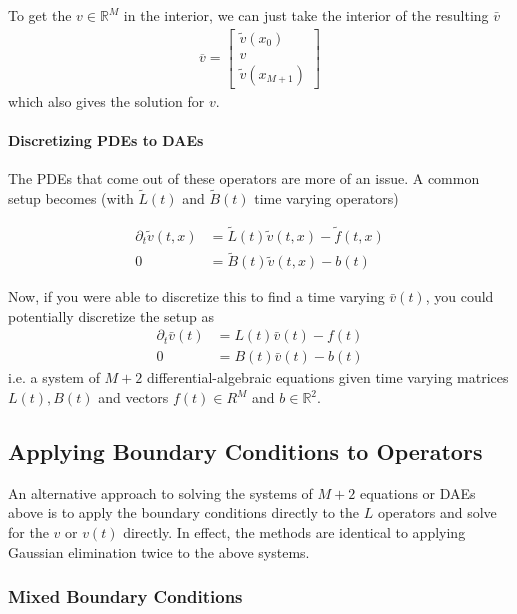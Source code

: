 \documentclass[11pt]{article}
\newcommand{\R}{\ensuremath{\mathbb{R}}}
\newcommand{\D}[1][]{\ensuremath{\partial_{#1}}}
\theoremstyle{definition}
\begin{document}
To get the $v\in \R^M$ in the interior, we can just take the interior of the resulting $\bar{v}$
\begin{align}
	\overline{v} = \begin{bmatrix}
	\tilde{v}(x_0) \\
	v \\
	\tilde{v}(x_{M+1})
	\end{bmatrix}
\end{align}
which also gives the solution for $v$.

\paragraph{Discretizing PDEs to DAEs}
The PDEs that come out of these operators are more of an issue.  A common setup becomes (with $\tilde{L}(t)$ and $\tilde{B}(t)$ time varying operators)

\begin{align}
	\D[t] \tilde{v}(t,x) &= \tilde{L}(t) \tilde{v}(t,x) - \tilde{f}(t,x)  \\
	0 &= \tilde{B}(t) \tilde{v}(t,x) - b(t)
\end{align}

Now, if you were able to discretize this to find a time varying $\bar{v}(t)$, you could potentially discretize the setup as
\begin{align}
	\D[t] \bar{v}(t) &= L(t) \bar{v}(t) - f(t)\\
	0 &= B(t) \bar{v}(t) - b(t)
\end{align}
i.e. a system of $M+2$ differential-algebraic equations given time varying matrices $L(t), B(t)$ and vectors $f(t) \in R^M$ and $b \in \R^2$.


\subsection{Applying Boundary Conditions to Operators}\label{subsec:applying-bc-regular}

An alternative approach to solving the systems of $M+2$ equations or DAEs above is to apply the boundary conditions directly to the $L$ operators and solve for the $v$ or $v(t)$ directly.  In effect, the methods are identical to applying Gaussian elimination twice to the above systems.

\subsubsection{Mixed Boundary Conditions}
\end{document}
